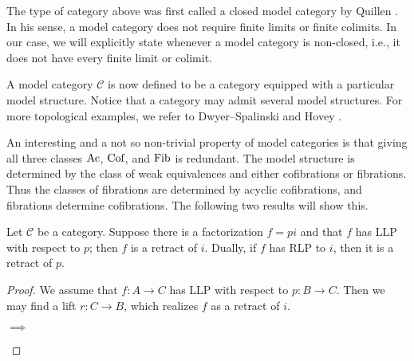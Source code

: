 \documentclass[../thesis.tex]{subfiles}
\begin{document}
            \begin{remark}
                The type of category above was first called a closed model category by Quillen \cite{Quillen67}. In his sense, a model category does not require finite limits or finite colimits. In our case, we will explicitly state whenever a model category is non-closed, i.e., it does not have every finite limit or colimit.
            \end{remark}

            A model category $\mathcal{C}$ is now defined to be a category equipped with a particular model structure. Notice that a category may admit several model structures. For more topological examples, we refer to Dwyer--Spalinski \cite{Dwyer95} and Hovey \cite{Hovey99}.

            An interesting and a not so non-trivial property of model categories is that giving all three classes $\tt{Ac}$, $\tt{Cof}$, and $\tt{Fib}$ is redundant. The model structure is determined by the class of weak equivalences and either cofibrations or fibrations. Thus the classes of fibrations are determined by acyclic cofibrations, and fibrations determine cofibrations. The following two results will show this.

            \begin{lemma}\label{lem: retract-argument}
                Let $\mathcal{C}$ be a category. Suppose there is a factorization $f = pi$ and that $f$ has LLP with respect to $p$; then $f$ is a retract of $i$. Dually, if $f$ has RLP to $i$, then it is a retract of $p$.
            \end{lemma}

            \begin{proof}
                We assume that $f: A \rightarrow C$ has LLP with respect to $p: B \rightarrow C$. Then we may find a lift $r: C \rightarrow B$, which realizes $f$ as a retract of $i$.
                
                \begin{center}
                     $\implies$
                \end{center}
            \end{proof}
\end{document}
